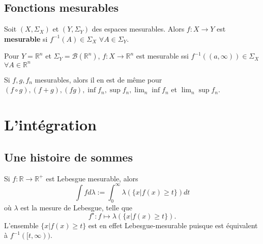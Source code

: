 \subsection{Fonctions mesurables}

\begin{definition}
    Soit $(X,\Sigma_X)$ et $(Y,\Sigma_Y)$ des espaces mesurables. Alors $f:X\to Y$ est \textbf{mesurable} si $f^{-1}(A)\in\Sigma_X$ $\forall A\in\Sigma_Y$.
\end{definition}

\begin{lemme}
    Pour $Y=\mathbb{R}^n$ et $\Sigma_Y = \mathcal{B}(\mathbb{R}^n)$, $f:X\to\mathbb{R}^n$ est mesurable ssi $f^{-1}((a,\infty))\in\Sigma_X$ $\forall A\in\mathbb{R}^n$
\end{lemme}

\begin{prop}
    Si $f,g,f_n$ mesurables, alors il en est de même pour $(f\circ g), (f+g), (fg), \inf f_n, \sup f_n, \lim_n \inf f_n$ et $\lim_n \sup f_n$.
\end{prop}


\section{L'intégration}

\subsection{Une histoire de sommes}

Si $f:\mathbb{R}\to\mathbb{R}^+$ est Lebesgue mesurable, alors
\begin{equation}
    \int f d\lambda := \int_0^\infty \lambda(\{x|f(x)\geq t\}) dt
\end{equation}
où $\lambda$ est la mesure de Lebesgue, telle que
\begin{equation}
    f^\star : f \mapsto \lambda(\{x|f(x)\geq t\}).
\end{equation}
L'ensemble $\{x|f(x)\geq t\}$ est en effet Lebesgue-mesurable puisque est équivalent à $f^{-1}([t,\infty))$.

